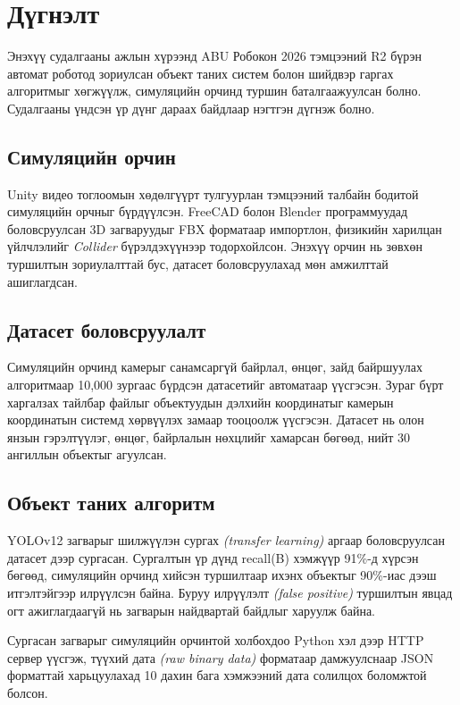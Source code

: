 \section{Дүгнэлт}
\label{sec:conclusion}

Энэхүү судалгааны ажлын хүрээнд ABU Робокон 2026 тэмцээний R2 бүрэн автомат роботод зориулсан объект таних систем болон шийдвэр гаргах алгоритмыг хөгжүүлж, симуляцийн орчинд туршин баталгаажуулсан болно. Судалгааны үндсэн үр дүнг дараах байдлаар нэгтгэн дүгнэж болно.

\subsection{Симуляцийн орчин}

Unity видео тоглоомын хөдөлгүүрт тулгуурлан тэмцээний талбайн бодитой симуляцийн орчныг бүрдүүлсэн. FreeCAD болон Blender программуудад боловсруулсан 3D загваруудыг FBX форматаар импортлон, физикийн харилцан үйлчлэлийг \textit{Collider} бүрэлдэхүүнээр тодорхойлсон. Энэхүү орчин нь зөвхөн туршилтын зориулалттай бус, датасет боловсруулахад мөн амжилттай ашиглагдсан.

\subsection{Датасет боловсруулалт}

Симуляцийн орчинд камерыг санамсаргүй байрлал, өнцөг, зайд байршуулах алгоритмаар 10,000 зургаас бүрдсэн датасетийг автоматаар үүсгэсэн. Зураг бүрт харгалзах тайлбар файлыг объектуудын дэлхийн координатыг камерын координатын системд хөрвүүлэх замаар тооцоолж үүсгэсэн. Датасет нь олон янзын гэрэлтүүлэг, өнцөг, байрлалын нөхцлийг хамарсан бөгөөд, нийт 30 ангиллын объектыг агуулсан.

\subsection{Объект таних алгоритм}

YOLOv12 загварыг шилжүүлэн сургах \textit{(transfer learning)} аргаар боловсруулсан датасет дээр сургасан. Сургалтын үр дүнд recall(B) хэмжүүр 91\%-д хүрсэн бөгөөд, симуляцийн орчинд хийсэн туршилтаар ихэнх объектыг 90\%-иас дээш итгэлтэйгээр илрүүлсэн байна. Буруу илрүүлэлт \textit{(false positive)} туршилтын явцад огт ажиглагдаагүй нь загварын найдвартай байдлыг харуулж байна.

Сургасан загварыг симуляцийн орчинтой холбохдоо Python хэл дээр HTTP сервер үүсгэж, түүхий дата \textit{(raw binary data)} форматаар дамжуулснаар JSON форматтай харьцуулахад 10 дахин бага хэмжээний дата солилцох боломжтой болсон.

